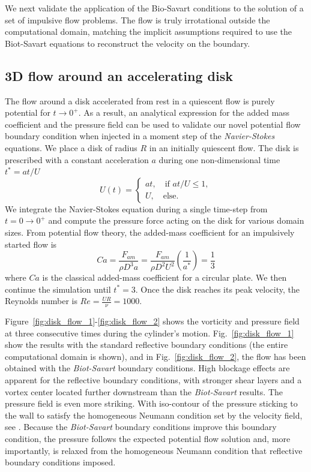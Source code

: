 \documentclass[preprint,12pt]{elsarticle}
\begin{document}
We next validate the application of the Bio-Savart conditions to the solution of a set of impulsive flow problems. The flow is truly irrotational outside the computational domain, matching the implicit assumptions required to use the Biot-Savart equations to reconstruct the velocity on the boundary. 

\subsection{3D flow around an accelerating disk}

The flow around a disk accelerated from rest in a quiescent flow is purely potential for $t\to 0^+$. As a result, an analytical expression for the added mass coefficient and the pressure field can be used to validate our novel potential flow boundary condition when injected in a moment step of the \emph{Navier-Stokes} equations. We place a disk of radius $R$ in an initially quiescent flow. The disk is prescribed with a constant acceleration $a$ during one non-dimensional time $t^*=at/U$
\begin{equation}
    U(t) = \begin{cases}
        at, \quad \text{if } at/U\le1,\\
        U, \quad \text{else}.
    \end{cases}
\end{equation}
We integrate the Navier-Stokes equation during a single time-step from $t=0\to0^+$ and compute the pressure force acting on the disk for various domain sizes. From potential flow theory, the added-mass coefficient for an impulsively started flow is
\begin{equation}
    Ca  = \frac{F_{am}}{\rho D^3 a} = \frac{F_{am}}{\rho D^2U^2}\left(\frac{1}{a^*}\right) = \frac{1}{3}
\end{equation}
where $Ca$ is the classical added-mass coefficient for a circular plate. We then continue the simulation until $t^*=3$. Once the disk reaches its peak velocity, the Reynolds number is $Re=\frac{UR}{\nu}=1000$. 

Figure~\ref{fig:disk_flow_1}-\ref{fig:disk_flow_2} shows the vorticity and pressure field at three consecutive times during the cylinder's motion. Fig.~\ref{fig:disk_flow_1} show the results with the standard reflective boundary conditions (the entire computational domain is shown), and in Fig.~\ref{fig:disk_flow_2}, the flow has been obtained with the \emph{Biot-Savart} boundary conditions. High blockage effects are apparent for the reflective boundary conditions, with stronger shear layers and a vortex center located further downstream than the \emph{Biot-Savart} results. The pressure field is even more striking. With iso-contour of the pressure sticking to the wall to satisfy the homogeneous Neumann condition set by the velocity field, see \cite{}. Because the \emph{Biot-Savart} boundary conditions improve this boundary condition, the pressure follows the expected potential flow solution and, more importantly, is relaxed from the homogeneous Neumann condition that reflective boundary conditions imposed.
\end{document}

